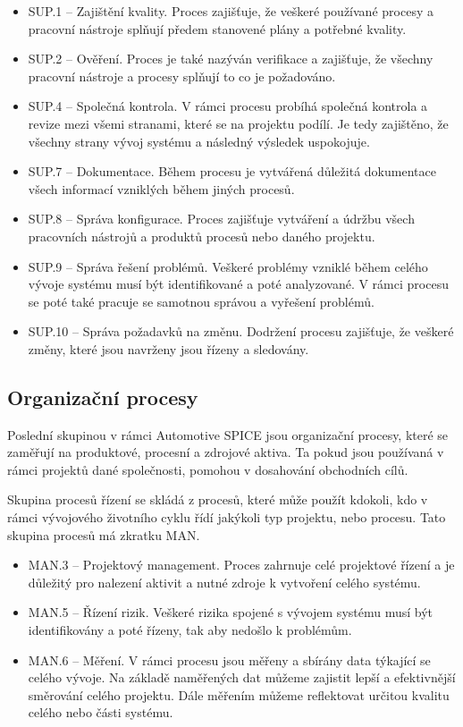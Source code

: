 \documentclass[czech,master]{diploma}
\begin{document}
\begin{itemize}
	\item SUP.1 -- Zajištění kvality. Proces zajišťuje, že veškeré používané procesy a pracovní nástroje splňují předem stanovené plány a potřebné kvality.
	\item SUP.2 -- Ověření. Proces je také nazýván verifikace a zajišťuje, že všechny pracovní nástroje a procesy splňují to co je požadováno.
	\item SUP.4 -- Společná kontrola. V rámci procesu probíhá společná kontrola a revize mezi všemi stranami, které se na projektu podílí. Je tedy zajištěno, že všechny strany vývoj systému a následný výsledek uspokojuje.
	\item SUP.7 -- Dokumentace. Během procesu je vytvářená důležitá dokumentace všech informací vzniklých během jiných procesů.
	\item SUP.8 -- Správa konfigurace. Proces zajišťuje vytváření a údržbu všech pracovních nástrojů a produktů procesů nebo daného projektu.
	\item SUP.9 -- Správa řešení problémů. Veškeré problémy vzniklé během celého vývoje systému musí být identifikované a poté analyzované. V rámci procesu se poté také pracuje se samotnou správou a vyřešení problémů.
	\item SUP.10 -- Správa požadavků na změnu. Dodržení procesu zajišťuje, že veškeré změny, které jsou navrženy jsou řízeny a sledovány.
\end{itemize}

\subsection{Organizační procesy}
Poslední skupinou v rámci Automotive SPICE jsou organizační procesy, které se zaměřují na produktové, procesní a zdrojové aktiva. Ta pokud jsou používaná v rámci projektů dané společnosti, pomohou v dosahování obchodních cílů.

Skupina procesů řízení se skládá z procesů, které může použít kdokoli, kdo v rámci vývojového životního cyklu řídí jakýkoli typ projektu, nebo procesu. Tato skupina procesů má zkratku MAN.

\begin{itemize}
	\item MAN.3 -- Projektový management. Proces zahrnuje celé projektové řízení a je důležitý pro nalezení aktivit a nutné zdroje k vytvoření celého systému.
	\item MAN.5 -- Řízení rizik. Veškeré rizika spojené s vývojem systému musí být identifikovány a poté řízeny, tak aby nedošlo k problémům.
	\item MAN.6 -- Měření. V rámci procesu jsou měřeny a sbírány data týkající se celého vývoje. Na základě naměřených dat můžeme zajistit lepší a efektivnější směrování celého projektu. Dále měřením můžeme reflektovat určitou kvalitu celého nebo části systému.
\end{itemize}
\end{document}
